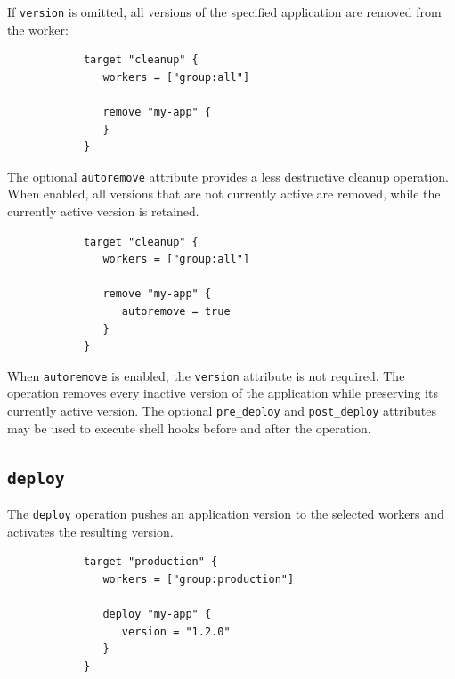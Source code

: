 \documentclass[11pt,a4paper]{article}
\begin{document}
    If \texttt{version} is omitted, all versions of the specified application are removed from the worker:

    \begin{center}
        \begin{verbatim}
            target "cleanup" {
               workers = ["group:all"]

               remove "my-app" {
               }
            }
        \end{verbatim}
    \end{center}

    The optional \texttt{autoremove} attribute provides a less destructive cleanup operation.
    When enabled, all versions that are not currently active are removed, while the currently active version is retained.

    \begin{center}
        \begin{verbatim}
            target "cleanup" {
               workers = ["group:all"]

               remove "my-app" {
                  autoremove = true
               }
            }
        \end{verbatim}
    \end{center}

    When \texttt{autoremove} is enabled, the \texttt{version} attribute is not required.
    The operation removes every inactive version of the application while preserving its currently active version.
    The optional \texttt{pre\_deploy} and \texttt{post\_deploy} attributes may be used to execute shell hooks before and after the operation.

    \subsection{\texttt{deploy}}\label{subsec:texttt_target_deploy}

    The \texttt{deploy} operation pushes an application version to the selected workers and activates the resulting version.

    \begin{center}
        \begin{verbatim}
            target "production" {
               workers = ["group:production"]

               deploy "my-app" {
                  version = "1.2.0"
               }
            }
        \end{verbatim}
    \end{center}
\end{document}

